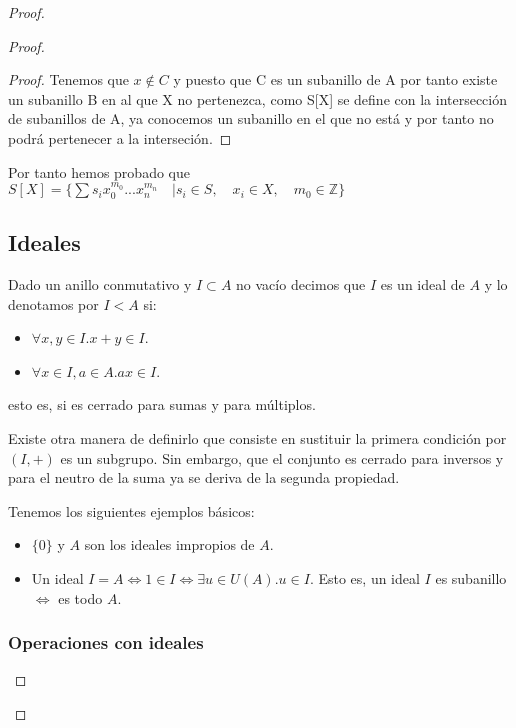 \begin{proof}
\begin{proof}
\begin{proof}
Tenemos que $ x \notin C $ y puesto que C es un subanillo de A por tanto existe un subanillo B en al que X no pertenezca, como S[X] se define con la intersección de subanillos de A, ya conocemos un subanillo en el que no está y por tanto no podrá pertenecer a la interseción.

\end {proof}

Por tanto hemos probado que $ S[X]= \{ \sum s_i x_{0}^{m_0} ...x_{n}^{m_n} \quad | s_i \in S, \quad x_i \in X,  \quad  m_0 \in \mathds{Z} \}$


\subsection{Ideales}

\begin{definition}
Dado un anillo conmutativo y $I \subset A$ no vacío decimos que $I$ es un ideal de $A$ y lo denotamos por $I < A$ si:

\begin{itemize}
\item $\forall x,y \in I. x + y \in I$.
\item $\forall x \in I,a \in A. ax \in I$. 
\end{itemize}

esto es, si es cerrado para sumas y para múltiplos.
\end{definition}

Existe otra manera de definirlo que consiste en sustituir la primera condición por $(I,+)$ es un subgrupo. Sin embargo, que el conjunto es cerrado para inversos y para el neutro de la suma ya se deriva de la segunda propiedad. 

\begin{example}
Tenemos los siguientes ejemplos básicos:

\begin{itemize}
\item $\{0\}$ y $A$ son los ideales impropios de $A$. 
\item Un ideal $I = A \iff 1 \in I \iff \exists u \in U(A).u \in I$. Esto es, un ideal $I$ es subanillo $\iff$ es todo $A$. 
\end{itemize}
\end{example}

\subsubsection{Operaciones con ideales}


\end{proof}
\end{proof}
